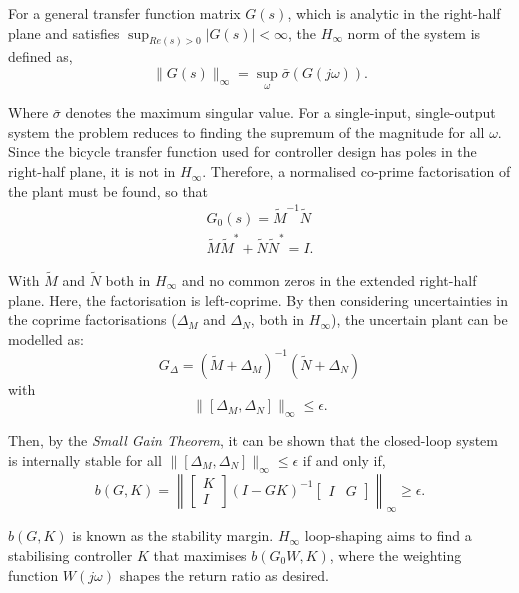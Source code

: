 For a general transfer function matrix $G(s)$, which is analytic in the right-half plane and satisfies $\sup_{Re(s) > 0}{|G(s)|}<\infty$, the $H_{\infty}$ norm of the system is defined as,
\begin{equation*}
\lVert G(s) \rVert_{\infty} = \sup_{\omega}{\bar{\sigma}(G(j\omega))}.
\end{equation*}

Where $\bar{\sigma}$ denotes the maximum singular value. For a single-input, single-output system the problem reduces to finding the supremum of the magnitude for all $\omega$. \\
Since the bicycle transfer function used for controller design has poles in the right-half plane, it is not in $H_{\infty}$. Therefore, a normalised co-prime factorisation of the plant must be found, so that
\begin{align*}
G_0(s) = \tilde{M}^{-1} \tilde{N} \\
\tilde{M} \tilde{M}^* + \tilde{N} \tilde{N}^* = I.
\end{align*}

With $\tilde{M}$ and $\tilde{N}$ both in $H_{\infty}$ and no common zeros in the extended right-half plane. Here, the factorisation is left-coprime. By then considering uncertainties in the coprime factorisations ($\Delta_M$ and $\Delta_N$, both in $H_{\infty}$), the uncertain plant can be modelled as:
\begin{equation*}
G_{\Delta} = (\tilde{M} + \Delta_M)^{-1} (\tilde{N} + \Delta_N)
\end{equation*}
with
\begin{equation*}
\lVert [\Delta_M, \Delta_N] \rVert_{\infty} \leq \epsilon.
\end{equation*}

Then, by the \textit{Small Gain Theorem}, it can be shown that the closed-loop system is internally stable for all $\lVert [\Delta_M, \Delta_N] \rVert_{\infty} \leq \epsilon$ if and only if,
\begin{equation*}
b(G,K) = \left \lVert \begin{bmatrix}
K \\
I
\end{bmatrix} (I - G K)^{-1} \begin{bmatrix}
I & G
\end{bmatrix} \right \rVert_{\infty} \geq \epsilon.
\end{equation*}

$b(G,K)$ is known as the stability margin. $H_{\infty}$ loop-shaping aims to find a stabilising controller $K$ that maximises $b(G_0 W,K)$, where the weighting function $W(j\omega)$ shapes the return ratio as desired. \\

